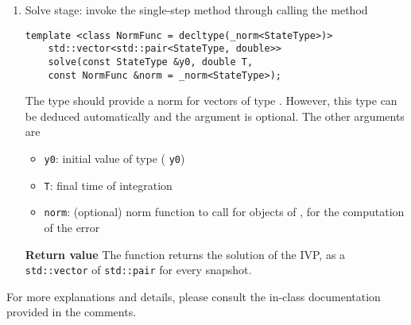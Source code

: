 \begin{enumerate}
\item Solve stage: invoke the single-step method through calling the method
  \begin{lstlisting}[emph={solve},style=cppsimple]
    template <class NormFunc = decltype(_norm<StateType>)>
    std::vector<std::pair<StateType, double>>
    solve(const StateType &y0, double T,
    const NormFunc &norm = _norm<StateType>);
  \end{lstlisting}
  The type  should provide a norm for vectors of type .
  However, this type can be deduced automatically and the argument  is optional.
  The other arguments are 
  \begin{itemize}
  \item \texttt{y0}: initial value of type  (
    \texttt{y0})
  \item \texttt{T}:
    final time of integration
  \item \texttt{norm}: (optional) norm function to call for objects of
    , for the computation of the error
  \end{itemize}
  \textbf{Return value} The function returns the solution of the IVP, as a
  \texttt{std::vector} of \texttt{std::pair}  for every snapshot.
\end{enumerate}



For more explanations and details, please consult the in-class documentation provided in
the comments.
